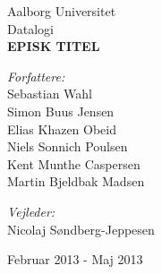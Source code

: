 \begin{titlingpage}
\color{fpcolor}
\centering
\vspace*{1.0cm}

\LARGE Aalborg Universitet\\[0.75cm]
\Large Datalogi\\[1.75cm]

\vspace{2.0cm}
{ \fontsize{26.2pt}{26.2pt} \bfseries EPISK TITEL}
\vspace{0.5cm}
\vspace{0.75cm}

\begin{minipage}{13.37cm}
  \begin{flushleft} \large
    \vspace{0pt}
    \emph{Forfattere:}\\
    Sebastian Wahl\\
    Simon Buus Jensen\\
    Elias Khazen Obeid\\
    Niels Sonnich Poulsen\\
    Kent Munthe Caspersen\\
    Martin Bjeldbak Madsen\\
  \end{flushleft}

  \begin{flushright} \large
    \vspace{-112pt}
    \emph{Vejleder:}\\
    Nicolaj Søndberg-Jeppesen
  \end{flushright}
\end{minipage}

\vfill

{\large Februar 2013 - Maj 2013}

\end{titlingpage}
